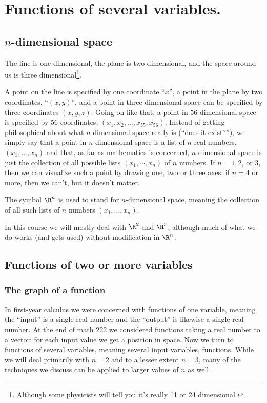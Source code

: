 \chapter{Functions of several variables.} 

\section{$n$-dimensional space}    %
The line is one-dimensional, the plane is two dimensional, and the
space around us is three dimensional\footnote{Although some physicists
will tell you it's really 11 or 24 dimensional.}.

A point on the line is specified by one coordinate ``$x$'', a point in
the plane by two coordinates, ``$(x, y)$'', and a point in three
dimensional space can be specified by three coordinates $(x, y, z)$.
Going on like that, a point in $56$-dimensional space is specified by
$56$ coordinates, $(x_1, x_2, \dots, x_{55}, x_{56})$.
Instead of getting philosophical about what $n$-dimensional space
really is (``does it exist?''), we simply say that a point in
$n$-dimensional  space is a list of $n$-real numbers, $(x_1, \dots,
x_n)$ and that, as far as mathematics is concerned, $n$-dimensional
space is just the collection of all possible lists $(x_1, \cdots,
x_n)$ of $n$ numbers.  If $n=1, 2$, or $3$, then we can visualize such
a point by drawing one, two or three axes;  if $n=4$ or more, then we
can't, but it doesn't matter.

The symbol $\R^n$ is used to stand for $n$-dimensional space, meaning
the collection of all such lists of $n$ numbers $(x_1, \dots, x_n)$.

In this course we will mostly deal with $\R^2$ and $\R^3$, although
much of what we do works (and gets used) without modification in $\R^n$.


\section{Functions of two or more variables}    %

\subsection{The graph of a function}    %
In first-year calculus we were concerned with functions of one
variable, meaning the ``input'' is a single real number and the
``output'' is likewise a single real number. At the end of math 222 we
considered functions taking a real number to a vector: for each input
value we get a position in space. Now we turn to functions of several
variables, meaning several input variables, functions.
While we will deal primarily with $n=2$ and to a lesser
extent $n=3$, many of the techniques we discuss can be applied
to larger values of $n$ as well. 

